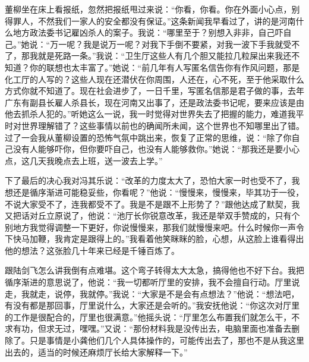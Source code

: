 \documentclass[12pt,oneside]{book}
\begin{document}
董柳坐在床上看报纸，忽然把报纸甩过来说：``你看，你看。你在外面小心点，别得罪人，不然我们一家人的安全都没有保证。''这条新闻我早看过了，讲的是河南什么地方政法委书记雇凶杀人的案子。我说：``哪里至于？别想入非非，自己吓自己。''她说：``万一呢？我是说万一呢？对我下手倒不要紧，对我一波下手我就受不了，那我就是死路一条。''我说：``卫生厅这些人有几个胆又能拉几粒屎出来我还不知道？你的联想也太丰富了。''她说：``前几年有人写匿名信告你有作风问题，那是化工厅的人写的？这些人现在还潜伏在你周围，人还在，心不死，至于他采取什么方式你就不知道了。现在社会进步了，一日千里，写匿名信那是君子做的事，去年广东有副县长雇人杀县长，现在河南又出事了，还是政法委书记呢，要来应该是由他去抓杀人犯的。''听她这么一说，我一时觉得对世界失去了把握的能力，难道我平时对世界理解错了？这些事情以前也的确闻所未闻，这个世界也不知哪里出了错。过了一会我从董柳设置的恐怖气氛中跳出来，恢复了正常的思维，说：``除了你自己没有人能够吓你，但你要吓自己，也没有人能够救你。''她说：``那我还是要小心点，这几天我晚点去上班，送一波去上学。''

下了最后的决心我对冯其乐说：``改革的力度太大了，恐怕大家一时也受不了，我想还是循序渐进可能稳妥些，你看呢？''他说：``慢慢来，慢慢来，毕其功于一役，不说大家受不了，连我都受不了。我是不是跟不上形势了？''跟他达成了默契，我又把话对丘立原说了，他说：``池厅长你锐意改革，我还是举双手赞成的，只有个别地方我觉得调整一下更好，你说慢慢来，那我们就慢慢来吧。什么时候你一声令下快马加鞭，我肯定是跟得上的。''我看着他笑眯眯的脸，心想，从这脸上谁看得出他的想法？这张脸几十年来已经是千锤百炼了。

跟陆剑飞怎么讲我倒有点难堪。这个弯子转得太大太急，搞得他也不好下台。我把循序渐进的意思说了，他说：``我一切都听厅里的安排，我不会擅自行动。厅里说走，我就走，说停，我就停。''我说：``大家是不是会有点想法？''他说：``想法吧，有没有都是那回事，厅里说什么，大家还是会听的。''我安抚他说：``你这次对厅里的工作是很配合的，厅里也很满意。''他摇头说：``厅里怎么布置我们就怎么干，不求有功，但求无过，嘿嘿。''又说：``那份材料我是没传出去，电脑里面也准备去删除了。只是事情是小龚他们几个人具体操作的，可能传出去了，那也不是从我这里出去的，适当的时候还麻烦厅长给大家解释一下。''
\end{document}
